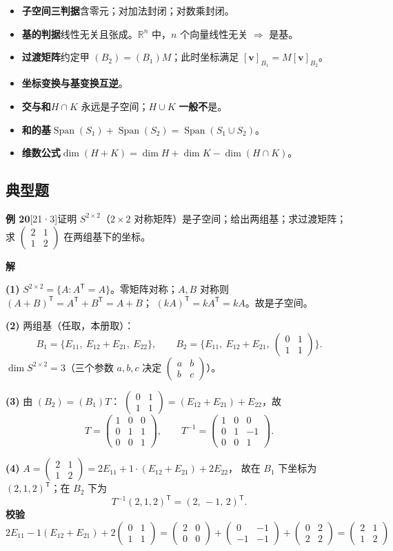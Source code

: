 \documentclass[10pt]{ctexart}
\newcommand{\Span}{\operatorname{Span}}
\newcommand{\TT}{^{\mathsf T}}
\newcommand{\bv}[1]{\begin{pmatrix}#1\end{pmatrix}}
\newcommand{\y}[1]{\textcolor{y21}{[21·#1]}}
\begin{document}
\begin{itemize}
\item \textbf{子空间三判据}\quad 含零元；对加法封闭；对数乘封闭。
\item \textbf{基的判据}\quad 线性无关且张成。$\mathbb{R}^n$ 中，$n$ 个向量线性无关 $\Rightarrow$ 是基。
\item \textbf{过渡矩阵}\quad 约定甲 $(B_2)=(B_1)M$；此时坐标满足 $[\mathbf v]_{B_1}=M[\mathbf v]_{B_2}$。
\item \textbf{坐标变换与基变换互逆}。
\item \textbf{交与和}\quad $H\cap K$ 永远是子空间；$H\cup K$ \textbf{一般不}是。
\item \textbf{和的基}\quad $\Span(S_1)+\Span(S_2)=\Span(S_1\cup S_2)$。
\item \textbf{维数公式}\quad $\dim(H+K)=\dim H+\dim K-\dim(H\cap K)$。
\end{itemize}

\subsection{典型题}

\textbf{例 20}\y{3}\quad 证明 $S^{2\times2}$（$2\times2$ 对称矩阵）是子空间；给出两组基；求过渡矩阵；
求 $\bv{2&1\\1&2}$ 在两组基下的坐标。

\textbf{解}\quad

\textbf{(1)} $S^{2\times2}=\{A:A\TT=A\}$。零矩阵对称；$A,B$ 对称则 $(A+B)\TT=A\TT+B\TT=A+B$；
$(kA)\TT=kA\TT=kA$。故是子空间。

\textbf{(2)} 两组基（任取，本册取）：
\[
B_1=\{E_{11},\ E_{12}+E_{21},\ E_{22}\},\qquad
B_2=\{E_{11},\ E_{12}+E_{21},\ \bv{0&1\\1&1}\}.
\]
$\dim S^{2\times2}=3$（三个参数 $a,b,c$ 决定 $\bv{a&b\\b&c}$）。

\textbf{(3)} 由 $(B_2)=(B_1)T$：
$\bv{0&1\\1&1}=(E_{12}+E_{21})+E_{22}$，故
\[
T=\bv{1&0&0\\0&1&1\\0&0&1},\qquad T^{-1}=\bv{1&0&0\\0&1&-1\\0&0&1}.
\]

\textbf{(4)} $A=\bv{2&1\\1&2}=2E_{11}+1\cdot(E_{12}+E_{21})+2E_{22}$，
故在 $B_1$ 下坐标为 $(2,1,2)\TT$；在 $B_2$ 下为
\[
T^{-1}(2,1,2)\TT=(2,\,-1,\,2)\TT .
\]
\textbf{校验}\quad $2E_{11}-1(E_{12}+E_{21})+2\bv{0&1\\1&1}=\bv{2&0\\0&0}+\bv{0&-1\\-1&-1}+\bv{0&2\\2&2}=\bv{2&1\\1&2}$ \checkmark
\end{document}
